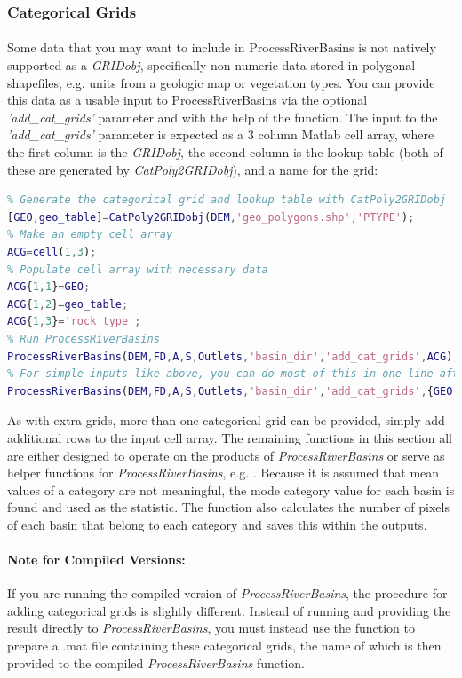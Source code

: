 \subsubsection{Categorical Grids} \label{sec:PRB_ACG}
\paragraph{}Some data that you may want to include in ProcessRiverBasins is not natively supported as a \textit{GRIDobj}, specifically non-numeric data stored in polygonal shapefiles, e.g. units from a geologic map or vegetation types. You can provide this data as a usable input to ProcessRiverBasins via the optional \textit{'add\_cat\_grids'} parameter and with the help of the  function. The input to the \textit{'add\_cat\_grids'} parameter is expected as a 3 column Matlab cell array, where the first column is the \textit{GRIDobj}, the second column is the lookup table (both of these are generated by \textit{CatPoly2GRIDobj}), and a name for the grid:

\begin{lstlisting}[language=Matlab]
% To run ProcessRiverBasins an additional categorical grid
% Generate the categorical grid and lookup table with CatPoly2GRIDobj
[GEO,geo_table]=CatPoly2GRIDobj(DEM,'geo_polygons.shp','PTYPE');
% Make an empty cell array
ACG=cell(1,3);
% Populate cell array with necessary data
ACG{1,1}=GEO;
ACG{1,2}=geo_table;
ACG{1,3}='rock_type';
% Run ProcessRiverBasins
ProcessRiverBasins(DEM,FD,A,S,Outlets,'basin_dir','add_cat_grids',ACG);
% For simple inputs like above, you can do most of this in one line after generating GEO and geo_table with CatPoly2GRIDobj
ProcessRiverBasins(DEM,FD,A,S,Outlets,'basin_dir','add_cat_grids',{GEO geo_table 'geology'});
\end{lstlisting}

\noindent
As with extra grids, more than one categorical grid can be provided, simply add additional rows to the input cell array. The remaining functions in this section all are either designed to operate on the products of \textit{ProcessRiverBasins} or serve as helper functions for \textit{ProcessRiverBasins}, e.g. . Because it is assumed that mean values of a category are not meaningful, the mode category value for each basin is found and used as the statistic. The function also calculates the number of pixels of each basin that belong to each category and saves this within the outputs.

\paragraph{Note for Compiled Versions:} If you are running the compiled version of \textit{ProcessRiverBasins}, the procedure for adding categorical grids is slightly different. Instead of running  and providing the result directly to \textit{ProcessRiverBasins}, you must instead use the  function to prepare a .mat file containing these categorical grids, the name of which is then provided to the compiled \textit{ProcessRiverBasins} function.

